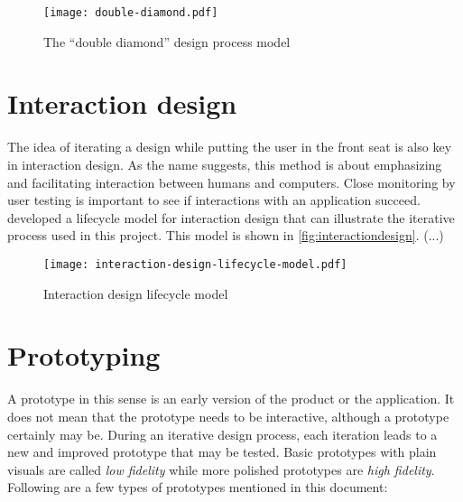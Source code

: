 \begin{figure}
    \centering
    \texttt{[image: double-diamond.pdf]}
    \caption{The \enquote{double diamond} design process model}
    \label{fig:doublediamond}
\end{figure}



\section{Interaction design}
\label{sec:interactiondesign}

The idea of iterating a design while putting the user in the front seat is also key in interaction design. As the name suggests, this method is about emphasizing and facilitating interaction between humans and computers. Close monitoring by user testing is important to see if interactions with an application succeed. \textcite{preece2015} developed a lifecycle model for interaction design that can illustrate the iterative process used in this project. This model is shown in \autoref{fig:interactiondesign}. (...)


\begin{figure}
    \centering
    \texttt{[image: interaction-design-lifecycle-model.pdf]}
    \caption{Interaction design lifecycle model}
    \label{fig:interactiondesign}
\end{figure}

\section{Prototyping}
\label{sec:prototyping}

A prototype in this sense is an early version of the product or the application. It does not mean that the prototype needs to be interactive, although a prototype certainly may be. During an iterative design process, each iteration leads to a new and improved prototype that may be tested. Basic prototypes with plain visuals are called \emph{low fidelity} while more polished prototypes are \emph{high fidelity}. Following are a few types of prototypes mentioned in this document:

